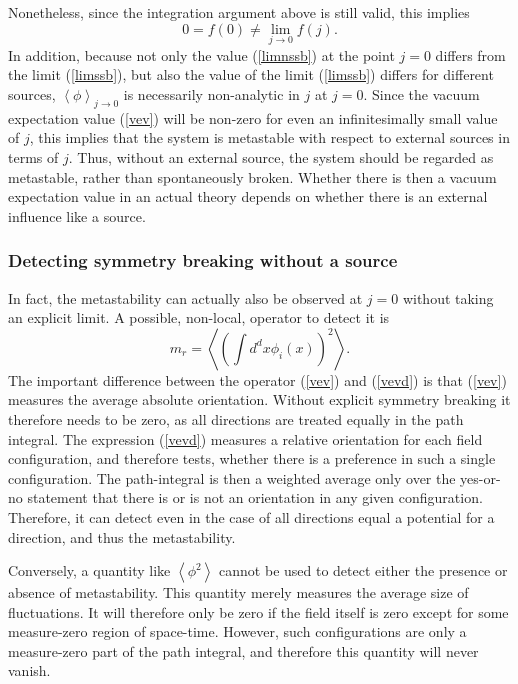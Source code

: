\documentclass[final,twoside,12pt]{article}
\newcommand*{\no}{\noindent}
\newcommand*{\be}{\begin{equation}}
\newcommand*{\ee}{\end{equation}}
\newcommand*{\pref}[1]{(\ref{#1})}
\newcommand*{\1}{1\!\!\!\bot}
\newcommand*{\la}{\left\langle}
\newcommand*{\ra}{\right\rangle}
\begin{document}
Nonetheless, since the integration argument above is still valid, this implies
\be
0=f(0)\neq\lim_{j\to 0}f(j)\label{limnssb}.
\ee
\no In addition, because not only the value \pref{limnssb} at the point $j=0$ differs from the limit \pref{limssb}, but also the value of the limit \pref{limssb} differs for different sources, $\la\phi\ra_{j\to 0}$ is necessarily non-analytic in $j$ at $j=0$. Since the vacuum expectation value \pref{vev} will be non-zero for even an infinitesimally small value of $j$, this implies that the system is metastable with respect to external sources in terms of $j$. Thus, without an external source, the system should be regarded as metastable, rather than spontaneously broken. Whether there is then a vacuum expectation value in an actual theory depends on whether there is an external influence like a source.

\subsubsection{Detecting symmetry breaking without a source}

In fact, the metastability can actually also be observed at $j=0$ without taking an explicit limit. A possible, non-local, operator to detect it is \cite{Langfeld:2002ic,Caudy:2007sf}
\be
m_r=\left\langle\left(\int d^dx\phi_i(x)\right)^2\right\rangle\label{vevd}.
\ee
\no The important difference between the operator \pref{vev} and \pref{vevd} is that \pref{vev} measures the average absolute orientation. Without explicit symmetry breaking it therefore needs to be zero, as all directions are treated equally in the path integral. The expression \pref{vevd} measures a relative orientation for each field configuration, and therefore tests, whether there is a preference in such a single configuration. The path-integral is then a weighted average only over the yes-or-no statement that there is or is not an orientation in any given configuration. Therefore, it can detect even in the case of all directions equal a potential for a direction, and thus the metastability.

Conversely, a quantity like $\la\phi^2\ra$ cannot be used to detect either the presence or absence of metastability. This quantity merely measures the average size of fluctuations. It will therefore only be zero if the field itself is zero except for some measure-zero region of space-time. However, such configurations are only a measure-zero part of the path integral, and therefore this quantity will never vanish.
\end{document}
